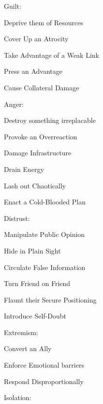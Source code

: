 \documentclass[
  oneside,
  statementpaper,
  9pt]{memoir}
\begin{document}
Guilt:

\begin{itemize*}

\item Deprive them of Resources 
\item Cover Up an Atrocity 
\item Take Advantage of a Weak Link 
\item Press an Advantage 
\item Cause Collateral Damage 

\end{itemize*}

Anger:

\begin{itemize*}

\item Destroy something irreplacable 
\item Provoke an Overreaction 
\item Damage Infrastructure 
\item Drain Energy 
\item Lash out Chaotically 
\item Enact a Cold-Blooded Plan 

\end{itemize*}

Distrust:

\begin{itemize*}

\item Manipulate Public Opinion 
\item Hide in Plain Sight 
\item Circulate False Information 
\item Turn Friend on Friend 
\item Flaunt their Secure Positioning 
\item Introduce Self-Doubt

\end{itemize*}

Extremism:

\begin{itemize*}

\item Convert an Ally 
\item Enforce Emotional barriers 
\item Respond Disproportionally

\end{itemize*}

Isolation:
\end{document}
